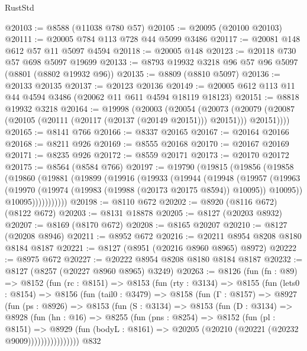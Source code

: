 \begin{lexlean}{RustStd}
\begin{coremodule}
@20103 := @8588 (@11038 @780 @57)
@20105 := @20095 (@20100 @20103)
@20111 := @20005 @784 @113 @728 @44 @5099 @3486
@20117 := @20081 @148 @612 @57 @11 @5097 @4594
@20118 := @20005 @148
@20123 := @20118 @730 @57 @698 @5097 @19699
@20133 := @8793 @19932 @3218 @96 @57 @96 @5097 (@8801 (@8802 @19932 @96))
@20135 := @8809 (@8810 @5097)
@20136 := @20133 @20135
@20137 := @20123 @20136
@20149 := @20005 @612 @113 @11 @44 @4594 @3486 (@20062 @11 @611 @4594 @18119 @18123)
@20151 := @8818 @19932 @3218
@20164 := @19998
    (@20003
      (@20054
        (@20073
          (@20079 (@20087 (@20105 (@20111 (@20117 (@20137 (@20149 @20151))) @20151))) @20151))))
@20165 := @8141 @766
@20166 := @8337 @20165
@20167 := @20164 @20166
@20168 := @8211 @926
@20169 := @8555 @20168
@20170 := @20167 @20169
@20171 := @8235 @926
@20172 := @8559 @20171
@20173 := @20170 @20172
@20175 := @8564 (@8584 @766)
@20197 := @19790
    (@19815
      (@19856
        (@19858
          (@19860
            (@19881
              (@19899
                (@19916
                  (@19933
                    (@19944
                      (@19948
                        (@19957
                          (@19963
                            (@19970 (@19974 (@19983 (@19988 (@20173 @20175 @8594)) @10095)) @10095))
                          @10095)))))))))))
@20198 := @8110 @672
@20202 := @8920 (@8116 @672) (@8122 @672)
@20203 := @8131 @18878
@20205 := @8127 (@20203 @8932)
@20207 := @8169 (@8170 @672)
@20208 := @8165 @20207
@20210 := @8127 (@20208 @8946)
@20211 := @8952 @672
@20216 := @20211 @8954 @8208 @8180 @8184 @8187
@20221 := @8127 (@8951 (@20216 @8960 @8965) @8972)
@20222 := @8975 @672
@20227 := @20222 @8954 @8208 @8180 @8184 @8187
@20232 := @8127 (@8257 (@20227 @8960 @8965) @3249)
@20263 := @8126
    (fun (fn : @89) =>
    @8152
      (fun (rc : @8151) =>
      @8153
        (fun (rty : @3134) =>
        @8155
          (fun (lets0 : @8154) =>
          @8156
            (fun (tail0 : @3479) =>
            @8158
              (fun (Γ : @8157) =>
              @8927
                (fun (ps : @8926) =>
                @8153
                  (fun (S : @3134) =>
                  @8153
                    (fun (D : @3134) =>
                    @8928
                      (fun (hn : @16) =>
                      @8255
                        (fun (pns : @8254) =>
                        @8152
                          (fun (pl : @8151) =>
                          @8929
                            (fun (bodyL : @8161) =>
                            @20205 (@20210 (@20221 (@20232 @9009))))))))))))))))
    @832

\end{coremodule}
\end{lexlean}

